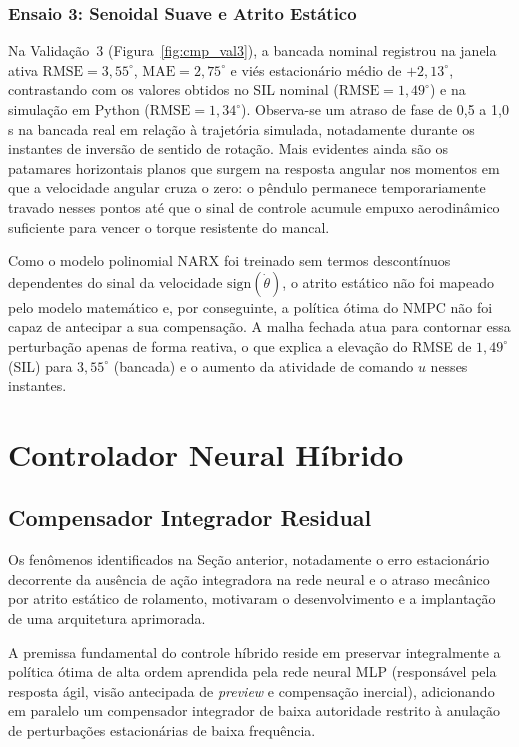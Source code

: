 \subsubsection{Ensaio 3: Senoidal Suave e Atrito Estático}
Na Validação~3 (Figura~\ref{fig:cmp_val3}), a bancada nominal registrou na janela ativa $\text{RMSE} = 3{,}55^\circ$, $\text{MAE} = 2{,}75^\circ$ e viés estacionário médio de $+2{,}13^\circ$, contrastando com os valores obtidos no SIL nominal ($\text{RMSE} = 1{,}49^\circ$) e na simulação em Python ($\text{RMSE} = 1{,}34^\circ$). Observa-se um atraso de fase de 0,5 a 1,0\,s na bancada real em relação à trajetória simulada, notadamente durante os instantes de inversão de sentido de rotação. Mais evidentes ainda são os patamares horizontais planos que surgem na resposta angular nos momentos em que a velocidade angular cruza o zero: o pêndulo permanece temporariamente travado nesses pontos até que o sinal de controle acumule empuxo aerodinâmico suficiente para vencer o torque resistente do mancal.

Como o modelo polinomial NARX foi treinado sem termos descontínuos dependentes do sinal da velocidade $\text{sign}(\dot{\theta})$, o atrito estático não foi mapeado pelo modelo matemático e, por conseguinte, a política ótima do NMPC não foi capaz de antecipar a sua compensação. A malha fechada atua para contornar essa perturbação apenas de forma reativa, o que explica a elevação do RMSE de $1{,}49^\circ$ (SIL) para $3{,}55^\circ$ (bancada) e o aumento da atividade de comando $u$ nesses instantes.

\section{Controlador Neural Híbrido}
\label{sec:res_hibrido}

\subsection{Compensador Integrador Residual}
\label{subsec:controlador_hibrido}

Os fenômenos identificados na Seção anterior, notadamente o erro estacionário decorrente da ausência de ação integradora na rede neural e o atraso mecânico por atrito estático de rolamento, motivaram o desenvolvimento e a implantação de uma arquitetura aprimorada.

A premissa fundamental do controle híbrido reside em preservar integralmente a política ótima de alta ordem aprendida pela rede neural MLP (responsável pela resposta ágil, visão antecipada de \textit{preview} e compensação inercial), adicionando em paralelo um compensador integrador de baixa autoridade restrito à anulação de perturbações estacionárias de baixa frequência.

